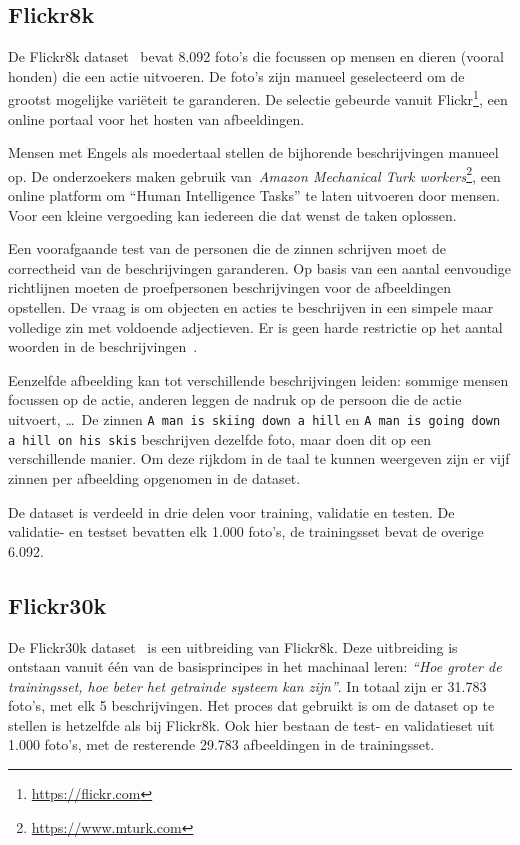 \subsection{Flickr8k}
\label{par:Flickr8k}
De Flickr8k dataset~\cite{Hodosh2013} bevat 8.092 foto's die focussen op mensen en dieren (vooral honden) die een actie uitvoeren. De foto's zijn manueel geselecteerd om de grootst mogelijke vari\"eteit te garanderen. De selectie gebeurde vanuit Flickr\footnote{\url{https://flickr.com}}, een online portaal voor het hosten van afbeeldingen.

Mensen met Engels als moedertaal stellen de bijhorende beschrijvingen manueel op. De onderzoekers maken gebruik van~\emph{Amazon Mechanical Turk workers}\footnote{\url{https://www.mturk.com}}, een online platform om ``Human Intelligence Tasks'' te laten uitvoeren door mensen. Voor een kleine vergoeding kan iedereen die dat wenst de taken oplossen. 

Een voorafgaande test van de personen die de zinnen schrijven moet de correctheid van de beschrijvingen garanderen. Op basis van een aantal eenvoudige richtlijnen moeten de proefpersonen beschrijvingen voor de afbeeldingen opstellen. De vraag is om objecten en acties te beschrijven in een simpele maar volledige zin met voldoende adjectieven. Er is geen harde restrictie op het aantal woorden in de beschrijvingen~\cite{Hockenmaier2014}.

Eenzelfde afbeelding kan tot verschillende beschrijvingen leiden: sommige mensen focussen op de actie, anderen leggen de nadruk op de persoon die de actie uitvoert, \ldots\  De zinnen \texttt{A man is skiing down a hill} en \texttt{A man is going down a hill on his skis} beschrijven dezelfde foto, maar doen dit op een verschillende manier. Om deze rijkdom in de taal te kunnen weergeven zijn er vijf zinnen per afbeelding opgenomen in de dataset.

De dataset is verdeeld in drie delen voor training, validatie en testen. De validatie- en testset bevatten elk 1.000 foto's, de trainingsset bevat de overige 6.092.


\subsection{Flickr30k}
\label{par:Flickr30k}
De Flickr30k dataset~\cite{Young2014} is een uitbreiding van Flickr8k. Deze uitbreiding is ontstaan vanuit \'e\'en van de basisprincipes in het machinaal leren: \emph{``Hoe groter de trainingsset, hoe beter het getrainde systeem kan zijn''}. In totaal zijn er 31.783 foto's, met elk 5 beschrijvingen. Het proces dat gebruikt is om de dataset op te stellen is hetzelfde als bij Flickr8k. Ook hier bestaan de test- en validatieset uit 1.000 foto's, met de resterende 29.783 afbeeldingen in de trainingsset.


